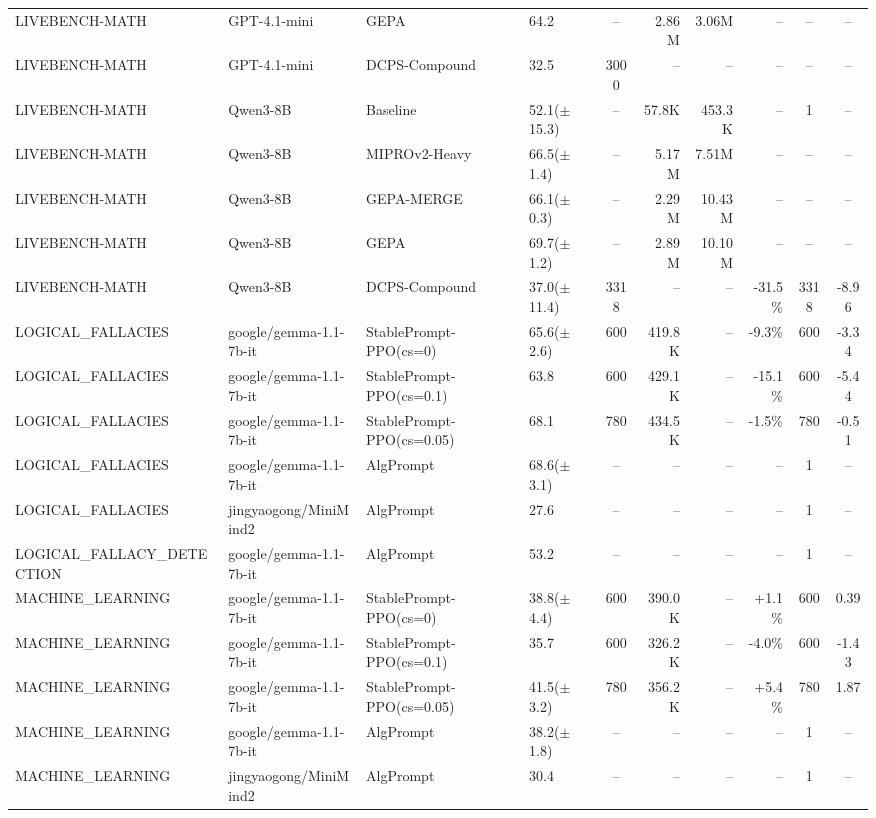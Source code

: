 {\begin{longtable}{@{}p{5.5cm}p{4.5cm}p{2.5cm}lcrrrcc@{}}
LIVEBENCH-MATH & GPT-4.1-mini & GEPA & 64.2 & -- & 2.86M & 3.06M & -- & -- & -- \\
LIVEBENCH-MATH & GPT-4.1-mini & DCPS-Compound & 32.5 & 3000 & -- & -- & -- & -- & -- \\
\midrule
LIVEBENCH-MATH & Qwen3-8B & Baseline & 52.1($\pm$15.3) & -- & 57.8K & 453.3K & -- & 1 & -- \\
LIVEBENCH-MATH & Qwen3-8B & MIPROv2-Heavy & 66.5($\pm$1.4) & -- & 5.17M & 7.51M & -- & -- & -- \\
LIVEBENCH-MATH & Qwen3-8B & GEPA-MERGE & 66.1($\pm$0.3) & -- & 2.29M & 10.43M & -- & -- & -- \\
LIVEBENCH-MATH & Qwen3-8B & GEPA & 69.7($\pm$1.2) & -- & 2.89M & 10.10M & -- & -- & -- \\
LIVEBENCH-MATH & Qwen3-8B & DCPS-Compound & 37.0($\pm$11.4) & 3318 & -- & -- & -31.5\% & 3318 & -8.96 \\
\midrule
LOGICAL\_FALLACIES & google/gemma-1.1-7b-it & StablePrompt-PPO(cs=0) & 65.6($\pm$2.6) & 600 & 419.8K & -- & -9.3\% & 600 & -3.34 \\
LOGICAL\_FALLACIES & google/gemma-1.1-7b-it & StablePrompt-PPO(cs=0.1) & 63.8 & 600 & 429.1K & -- & -15.1\% & 600 & -5.44 \\
LOGICAL\_FALLACIES & google/gemma-1.1-7b-it & StablePrompt-PPO(cs=0.05) & 68.1 & 780 & 434.5K & -- & -1.5\% & 780 & -0.51 \\
LOGICAL\_FALLACIES & google/gemma-1.1-7b-it & AlgPrompt & 68.6($\pm$3.1) & -- & -- & -- & -- & 1 & -- \\
\midrule
LOGICAL\_FALLACIES & jingyaogong/MiniMind2 & AlgPrompt & 27.6 & -- & -- & -- & -- & 1 & -- \\
\midrule
LOGICAL\_FALLACY\_DETECTION & google/gemma-1.1-7b-it & AlgPrompt & 53.2 & -- & -- & -- & -- & 1 & -- \\
\midrule
MACHINE\_LEARNING & google/gemma-1.1-7b-it & StablePrompt-PPO(cs=0) & 38.8($\pm$4.4) & 600 & 390.0K & -- & +1.1\% & 600 & 0.39 \\
MACHINE\_LEARNING & google/gemma-1.1-7b-it & StablePrompt-PPO(cs=0.1) & 35.7 & 600 & 326.2K & -- & -4.0\% & 600 & -1.43 \\
MACHINE\_LEARNING & google/gemma-1.1-7b-it & StablePrompt-PPO(cs=0.05) & 41.5($\pm$3.2) & 780 & 356.2K & -- & +5.4\% & 780 & 1.87 \\
MACHINE\_LEARNING & google/gemma-1.1-7b-it & AlgPrompt & 38.2($\pm$1.8) & -- & -- & -- & -- & 1 & -- \\
\midrule
MACHINE\_LEARNING & jingyaogong/MiniMind2 & AlgPrompt & 30.4 & -- & -- & -- & -- & 1 & -- \\

\end{longtable}}

